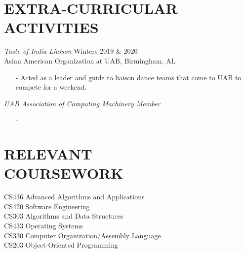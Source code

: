 \documentclass[margin, 10pt]{res} %
\begin{document}
\begin{resume}
\section{EXTRA-CURRICULAR \\ ACTIVITIES} 

{\sl Taste of India Liaison} \hfill Winters 2019 \& 2020 \\
Asian American Organization at UAB, Birmingham, AL
\begin{itemize}
\item[-] Acted as a leader and guide to liaison dance teams that come to UAB to compete for a weekend.
\end{itemize}

{\sl UAB Association of Computing Machinery Member}
\begin{itemize}
\item[-]
\end{itemize}

\section{RELEVANT \\ COURSEWORK}

CS436 Advanced Algorithms and Applications \\
CS420 Software Engineering \\
CS303 Algorithms and Data Structures \\
CS433 Operating Systems \\
CS330 Computer Organization/Assembly Language \\
CS203 Object-Oriented Programming



\end{resume}
\end{document}
